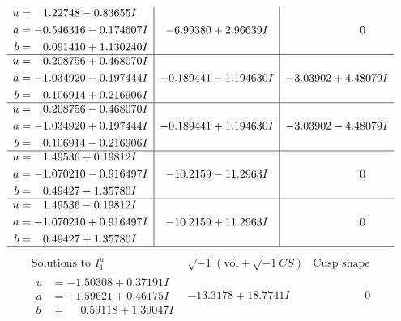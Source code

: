 \documentclass[1p]{elsarticle_modified}
\theoremstyle{definition}
\newcommand{\I}{\sqrt{-1}}
\begin{document}
$$\begin{array}{c|c|c}
\begin{aligned}
u &= \phantom{-}1.22748 - 0.83655 I \\
a &= -0.546316 - 0.174607 I \\
b &= \phantom{-}0.091410 + 1.130240 I\end{aligned}
 & -6.99380 + 2.96639 I & \phantom{-0.000000 } 0 \\ \hline\begin{aligned}
u &= \phantom{-}0.208756 + 0.468070 I \\
a &= -1.034920 - 0.197444 I \\
b &= \phantom{-}0.106914 + 0.216906 I\end{aligned}
 & -0.189441 - 1.194630 I & -3.03902 + 4.48079 I \\ \hline\begin{aligned}
u &= \phantom{-}0.208756 - 0.468070 I \\
a &= -1.034920 + 0.197444 I \\
b &= \phantom{-}0.106914 - 0.216906 I\end{aligned}
 & -0.189441 + 1.194630 I & -3.03902 - 4.48079 I \\ \hline\begin{aligned}
u &= \phantom{-}1.49536 + 0.19812 I \\
a &= -1.070210 - 0.916497 I \\
b &= \phantom{-}0.49427 - 1.35780 I\end{aligned}
 & -10.2159 - 11.2963 I & \phantom{-0.000000 } 0 \\ \hline\begin{aligned}
u &= \phantom{-}1.49536 - 0.19812 I \\
a &= -1.070210 + 0.916497 I \\
b &= \phantom{-}0.49427 + 1.35780 I\end{aligned}
 & -10.2159 + 11.2963 I & \phantom{-0.000000 } 0\\
 \hline 
 \end{array}$$\newpage$$\begin{array}{c|c|c}  
\text{Solutions to }I^u_{1}& \I (\text{vol} + \sqrt{-1}CS) & \text{Cusp shape}\\
 \hline 
\begin{aligned}
u &= -1.50308 + 0.37191 I \\
a &= -1.59621 + 0.46175 I \\
b &= \phantom{-}0.59118 + 1.39047 I\end{aligned}
 & -13.3178 + 18.7741 I & \phantom{-0.000000 } 0 \\ \hline\begin{aligned}

\end{aligned}
\end{array}$$
\end{document}
